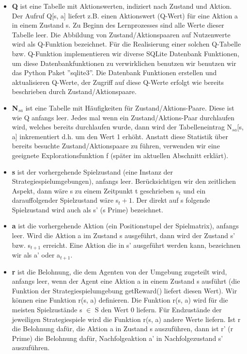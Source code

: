 \begin{itemize}
\item \textbf{Q} ist eine Tabelle mit Aktionswerten, indiziert nach Zustand und Aktion. Der Aufruf Q[s, a] liefert z.B. einen Aktionswert (Q-Wert) für eine Aktion a in einem Zustand s. Zu Beginn des Lernprozesses sind alle Werte dieser Tabelle leer. Die Abbildung von Zustand/Aktionspaaren auf Nutzenwerte wird als Q-Funktion bezeichnet. Für die Realisierung einer solchen Q-Tabelle bzw. Q-Funktion implementieren wir diverse SQLite Datenbank Funktionen, um diese Datenbankfunktionen zu verwirklichen benutzen wir benutzen wir das Python Paket ''sqlite3''. Die Datenbank Funktionen erstellen und aktualisieren Q-Werte, der Zugriff auf diese Q-Werte erfolgt wie bereits beschrieben durch Zustand/Aktionspaare.

\item \textbf{N$_{sa}$} ist eine Tabelle mit Häufigkeiten für Zustand/Aktions-Paare.  Diese ist wie Q anfangs leer. Jedes mal wenn ein Zustand/Aktions-Paar durchlaufen wird, welches bereits durchlaufen wurde, dann wird der Tabelleneintrag N$_{sa}$[s, a] inkrementiert d.h. um den Wert 1 erhöht. Anstatt diese Statistik über bereits besuchte Zustand/Aktionspaare zu führen, verwenden wir eine geeignete Explorationsfunktion f (später im aktuellen Abschnitt erklärt).
\newpage

\item \textbf{s} ist der vorhergehende Spielzustand (eine Instanz der Strategiespielumgebungen), anfangs leer. Berücksichtigen wir den zeitlichen Aspekt, dann wäre s zu einem Zeitpunkt t geschrieben s${_t}$ und ein darauffolgender Spielzustand wäre s${_t+1}$. Der direkt auf s folgende Spielzustand wird auch als s' (s Prime) bezeichnet.

\item \textbf{a} ist die vorhergehende Aktion (ein Positionstupel der Spielmatrix), anfangs leer. Wird die Aktion a im Zustand s ausgeführt, dann wird der Zustand s' bzw. s$_{t+1}$ erreicht. Eine Aktion die in s' ausgeführt werden kann, bezeichnen wir als a' oder a$_{t+1}$.

\item \textbf{r} ist die Belohnung, die dem Agenten von der Umgebung zugeteilt wird, anfangs leer, wenn der Agent eine Aktion a in einem Zustand s ausführt (die Funktion der Strategiespielumgebung getReward() liefert diesen Wert). Wir können eine Funktion r(s, a) definieren. Die Funktion r(s, a) wird für die meisten Spielzustände s $\in$ S den Wert 0 liefern. Für Endzustände der jeweiligen Strategiespiele wird die Funktion r(s, a) andere Werte liefern. Ist r die Belohnung dafür, die Aktion a in Zustand s auszuführen, dann ist r' (r Prime) die Belohnung dafür, Nachfolgeaktion a' in Nachfolgezustand s' auszuführen.
\end{itemize}

